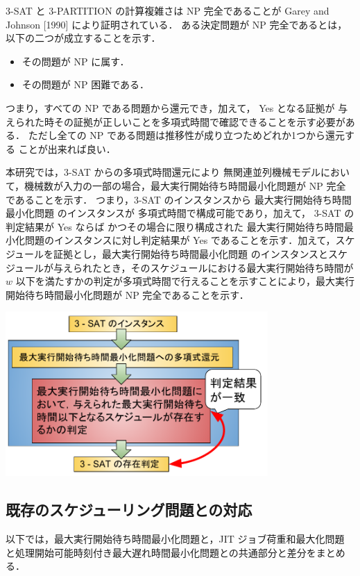 \documentclass[12pt]{optlab-bachelor}
\begin{document}
\textsc{3-SAT} と \textsc{3-PARTITION} の計算複雑さは NP 完全であることが Garey and Johnson [1990] \cite{3SAT} により証明されている．
ある決定問題が NP 完全であるとは，以下の二つが成立することを示す．
\begin{itemize}
  \item その問題が NP に属す．
  \item その問題が NP 困難である．
\end{itemize}
つまり，すべての NP である問題から還元でき，加えて， Yes となる証拠が
与えられた時その証拠が正しいことを多項式時間で確認できることを示す必要がある．
ただし全ての NP である問題は推移性が成り立つためどれか1つから還元する
ことが出来れば良い．

本研究では，\textsc{3-SAT} からの多項式時間還元により 無関連並列機械モデルにおいて，機械数が入力の一部の場合，最大実行開始待ち時間最小化問題が NP 完全であることを示す．
つまり，\textsc{3-SAT} のインスタンスから 最大実行開始待ち時間最小化問題 のインスタンスが
多項式時間で構成可能であり，加えて， \textsc{3-SAT}  の判定結果が Yes ならば
かつその場合に限り構成された  最大実行開始待ち時間最小化問題のインスタンスに対し判定結果が Yes であることを示す．加えて，スケジュールを証拠とし，最大実行開始待ち時間最小化問題 のインスタンスとスケジュールが与えられたとき，そのスケジュールにおける最大実行開始待ち時間が $w$ 以下を満たすかの判定が多項式時間で行えることを示すことにより，最大実行開始待ち時間最小化問題が NP 完全であることを示す．

\begin{center}
  \includegraphics[width = 10cm]{figure/reduction.pdf}
\end{center}

\subsection{既存のスケジューリング問題との対応}
以下では，最大実行開始待ち時間最小化問題と，JIT ジョブ荷重和最大化問題
と処理開始可能時刻付き最大遅れ時間最小化問題との共通部分と差分をまとめ
る．
\end{document}
